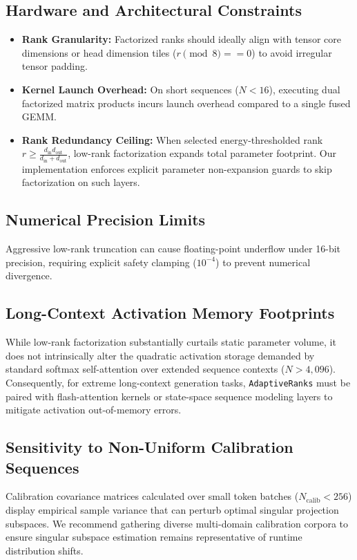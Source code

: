 \subsection{Hardware and Architectural Constraints}
\begin{itemize}
\item \textbf{Rank Granularity:} Factorized ranks should ideally align with tensor core dimensions or head dimension tiles ($r \pmod 8 == 0$) to avoid irregular tensor padding.
\item \textbf{Kernel Launch Overhead:} On short sequences ($N < 16$), executing dual factorized matrix products incurs launch overhead compared to a single fused GEMM.
\item \textbf{Rank Redundancy Ceiling:} When selected energy-thresholded rank $r \ge \frac{d_{\text{in}} d_{\text{out}}}{d_{\text{in}} + d_{\text{out}}}$, low-rank factorization expands total parameter footprint. Our implementation enforces explicit parameter non-expansion guards to skip factorization on such layers.
\end{itemize}

\subsection{Numerical Precision Limits}
Aggressive low-rank truncation can cause floating-point underflow under 16-bit precision, requiring explicit safety clamping ($10^{-4}$) to prevent numerical divergence.

\subsection{Long-Context Activation Memory Footprints}
While low-rank factorization substantially curtails static parameter volume, it does not intrinsically alter the quadratic activation storage demanded by standard softmax self-attention over extended sequence contexts ($N > 4{,}096$). Consequently, for extreme long-context generation tasks, \texttt{AdaptiveRanks} must be paired with flash-attention kernels or state-space sequence modeling layers to mitigate activation out-of-memory errors.

\subsection{Sensitivity to Non-Uniform Calibration Sequences}
Calibration covariance matrices calculated over small token batches ($N_{\text{calib}} < 256$) display empirical sample variance that can perturb optimal singular projection subspaces. We recommend gathering diverse multi-domain calibration corpora to ensure singular subspace estimation remains representative of runtime distribution shifts.


